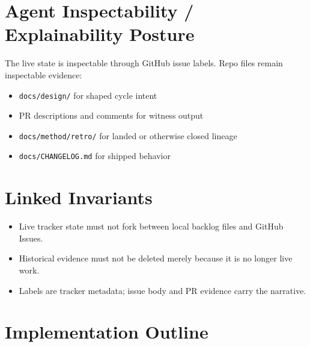 \section{Agent Inspectability / Explainability Posture}\label{record-207-agent-inspectability-explainability-posture}

The live state is inspectable through GitHub issue labels. Repo files remain inspectable evidence:

\begin{itemize}
\tightlist
\item
  \texttt{d\allowbreak{}o\allowbreak{}c\allowbreak{}s\allowbreak{}/\allowbreak{}d\allowbreak{}e\allowbreak{}s\allowbreak{}i\allowbreak{}g\allowbreak{}n\allowbreak{}/} for shaped cycle intent
\item
  PR descriptions and comments for witness output
\item
  \texttt{d\allowbreak{}o\allowbreak{}c\allowbreak{}s\allowbreak{}/\allowbreak{}m\allowbreak{}e\allowbreak{}t\allowbreak{}h\allowbreak{}o\allowbreak{}d\allowbreak{}/\allowbreak{}r\allowbreak{}e\allowbreak{}t\allowbreak{}r\allowbreak{}o\allowbreak{}/} for landed or otherwise closed lineage
\item
  \texttt{d\allowbreak{}o\allowbreak{}c\allowbreak{}s\allowbreak{}/\allowbreak{}C\allowbreak{}H\allowbreak{}A\allowbreak{}N\allowbreak{}G\allowbreak{}E\allowbreak{}L\allowbreak{}O\allowbreak{}G\allowbreak{}.\allowbreak{}m\allowbreak{}d} for shipped behavior
\end{itemize}

\section{Linked Invariants}\label{record-207-linked-invariants}

\begin{itemize}
\tightlist
\item
  Live tracker state must not fork between local backlog files and GitHub Issues.
\item
  Historical evidence must not be deleted merely because it is no longer live work.
\item
  Labels are tracker metadata; issue body and PR evidence carry the narrative.
\end{itemize}

\section{Implementation Outline}\label{record-207-implementation-outline}

